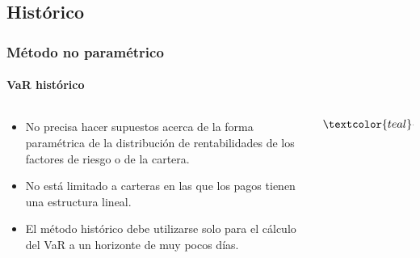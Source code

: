 \documentclass[aspectratio=169]{beamer}
\begin{document}
\subsection{Histórico}
\begin{frame}
\frametitle{Método no paramétrico}
\framesubtitle{VaR histórico}



\begin{columns}
\begin{column}{0.5\textwidth}

{\small
\begin{itemize}
\item No precisa hacer supuestos acerca de la forma paramétrica de la distribución de rentabilidades de los factores de riesgo o de la cartera.

\item No está limitado a carteras en las que los pagos tienen una estructura
lineal.

\item El método histórico debe utilizarse solo para el cálculo del VaR a un
horizonte de muy pocos días.

\end{itemize}
}



\end{column}
\begin{column}{0.5\textwidth}  %

\begin{equation}
\textcolor{teal}{VaR_{(1-\alpha)} = q_{(1-\alpha)(R)}}  \nonumber
\end{equation}

\end{column}
\end{columns}




\end{frame}



\end{document}
